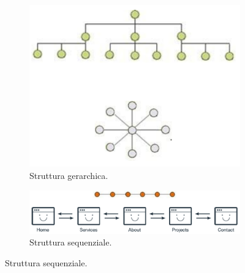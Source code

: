 \begin{figure}[!h]
	\begin{subfigure}[!h]{0.49 \textwidth}
		\centering
		\includegraphics[scale=0.3]{immagini/struttura-gerarchica.png}
		\caption{Struttura gerarchica.}
	\end{subfigure}
	\begin{subfigure}[!h]{0.49 \textwidth}
		\centering
		\includegraphics[scale=0.18]{immagini/struttura-sequenziale.png}
		\caption{Struttura sequenziale.}
	\end{subfigure}
\end{figure}

